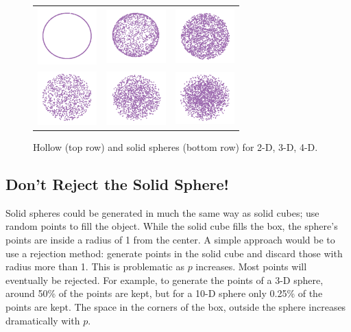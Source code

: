 \begin{figure}[ht]
\centering
\begin{tabular}{c c c}
\includegraphics[width=0.9in]{fig/sphere-2.pdf}
&\includegraphics[width=0.9in]{fig/sphere-3.pdf}
&\includegraphics[width=0.9in]{fig/sphere-4.pdf}
\\
\includegraphics[width=0.9in]{fig/sphere-2-solid.pdf}
&\includegraphics[width=0.9in]{fig/sphere-3-solid.pdf}
&\includegraphics[width=0.9in]{fig/sphere-4-solid.pdf}
\end{tabular}
\caption{Hollow (top row) and solid spheres (bottom row) for 2-D, 3-D,
  4-D.}
\label{holsolidsphere}
\end{figure}

\subsection{Don't Reject the Solid Sphere!}

Solid spheres could be generated in much the same way as solid cubes; use
random points to fill the object. While the solid cube fills the box,
the sphere's points are inside a radius of 1 from the center. A simple
approach would be to use a rejection method: generate points in the
solid cube and discard those with radius more than 1. This is
problematic as $p$ increases. Most points will eventually be rejected.
For example, to generate the points of a 3-D sphere, around 50\% of
the points are kept, but for a 10-D sphere only 0.25\% of the points
are kept. The space in the corners of the box, outside the sphere
increases dramatically with $p$.


